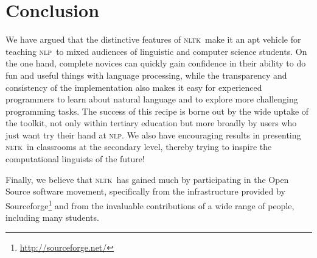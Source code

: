 \documentclass[11pt]{article}
\newcommand{\NLP}{\textsc{nlp}}
\newcommand{\NLTK}{\textsc{nltk}}
\begin{document}
\section{Conclusion}

We have argued that the distinctive features of \NLTK\ make it an apt
vehicle for teaching \NLP\ to mixed audiences of linguistic and
computer science students. On the one hand, complete novices can
quickly gain confidence in their ability to do fun and useful things
with language processing, while the transparency and consistency of
the implementation also makes it easy for experienced programmers to
learn about natural language and to explore more challenging
programming tasks. The success of this recipe is borne out by the wide
uptake of the toolkit, not only within tertiary education but more
broadly by users who just want try their hand at \NLP. We also have
encouraging results in presenting \NLTK\ in classrooms at the
secondary level, thereby trying to inspire the computational linguists of the
future!

Finally, we believe that \NLTK\ has gained much by participating 
in the Open Source software movement, specifically from
the infrastructure provided by
Sourceforge\footnote{\url{http://sourceforge.net/}} and from the
invaluable contributions of a wide range of people, including many
students.



\end{document}
